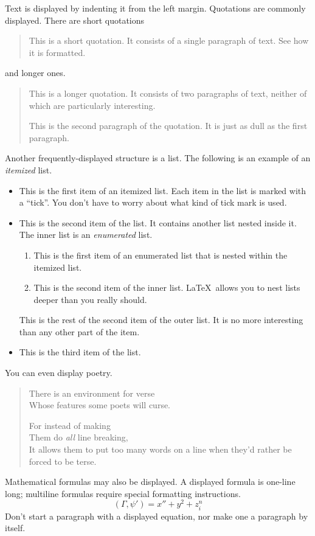 \documentclass{article}      %
\newcommand{\ip}[2]{(#1, #2)}
\begin{document}
Text is displayed by indenting it from the left
margin.  Quotations are commonly displayed.  There
are short quotations
\begin{quote}
   This is a short quotation.  It consists of a
   single paragraph of text.  See how it is formatted.
\end{quote}
and longer ones.
\begin{quotation}
   This is a longer quotation.  It consists of two
   paragraphs of text, neither of which are
   particularly interesting.

   This is the second paragraph of the quotation.  It
   is just as dull as the first paragraph.
\end{quotation}
Another frequently-displayed structure is a list.
The following is an example of an \emph{itemized}
list.
\begin{itemize}
   \item This is the first item of an itemized list.
         Each item in the list is marked with a ``tick''.
         You don't have to worry about what kind of tick
         mark is used.

   \item This is the second item of the list.  It
         contains another list nested inside it.  The inner
         list is an \emph{enumerated} list.
         \begin{enumerate}
            \item This is the first item of an enumerated
                  list that is nested within the itemized list.

            \item This is the second item of the inner list.
                  \LaTeX\ allows you to nest lists deeper than
                  you really should.
         \end{enumerate}
         This is the rest of the second item of the outer
         list.  It is no more interesting than any other
         part of the item.
   \item This is the third item of the list.
\end{itemize}
You can even display poetry.
\begin{verse}
   There is an environment
    for verse \\             %
   Whose features some poets %
   will curse.


   For instead of making\\
   Them do \emph{all} line breaking, \\
   It allows them to put too many words on a line when they'd rather be
   forced to be terse.
\end{verse}

Mathematical formulas may also be displayed.  A
displayed formula
is
one-line long; multiline
formulas require special formatting instructions.
   \[  \ip{\Gamma}{\psi'} = x'' + y^{2} + z_{i}^{n}\]
Don't start a paragraph with a displayed equation,
nor make one a paragraph by itself.
\end{document}
